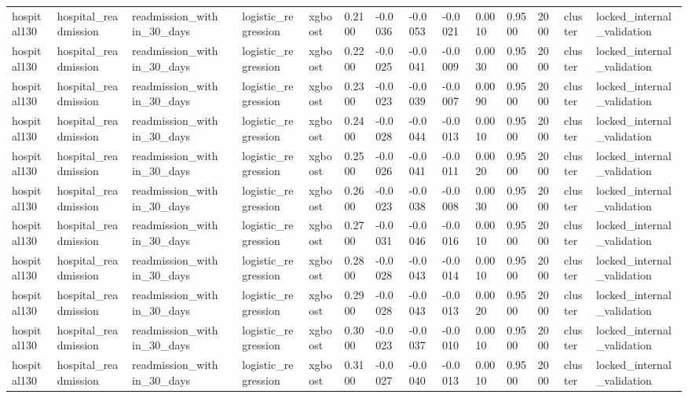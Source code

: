 \begin{tabular}{lllllllllllllll}
hospital130 & hospital\_readmission & readmission\_within\_30\_days &  & logistic\_regression & xgboost & 0.2100 & -0.0036 & -0.0053 & -0.0021 & 0.0010 & 0.9500 & 2000 & cluster & locked\_internal\_validation \\
hospital130 & hospital\_readmission & readmission\_within\_30\_days &  & logistic\_regression & xgboost & 0.2200 & -0.0025 & -0.0041 & -0.0009 & 0.0030 & 0.9500 & 2000 & cluster & locked\_internal\_validation \\
hospital130 & hospital\_readmission & readmission\_within\_30\_days &  & logistic\_regression & xgboost & 0.2300 & -0.0023 & -0.0039 & -0.0007 & 0.0090 & 0.9500 & 2000 & cluster & locked\_internal\_validation \\
hospital130 & hospital\_readmission & readmission\_within\_30\_days &  & logistic\_regression & xgboost & 0.2400 & -0.0028 & -0.0044 & -0.0013 & 0.0010 & 0.9500 & 2000 & cluster & locked\_internal\_validation \\
hospital130 & hospital\_readmission & readmission\_within\_30\_days &  & logistic\_regression & xgboost & 0.2500 & -0.0026 & -0.0041 & -0.0011 & 0.0020 & 0.9500 & 2000 & cluster & locked\_internal\_validation \\
hospital130 & hospital\_readmission & readmission\_within\_30\_days &  & logistic\_regression & xgboost & 0.2600 & -0.0023 & -0.0038 & -0.0008 & 0.0030 & 0.9500 & 2000 & cluster & locked\_internal\_validation \\
hospital130 & hospital\_readmission & readmission\_within\_30\_days &  & logistic\_regression & xgboost & 0.2700 & -0.0031 & -0.0046 & -0.0016 & 0.0010 & 0.9500 & 2000 & cluster & locked\_internal\_validation \\
hospital130 & hospital\_readmission & readmission\_within\_30\_days &  & logistic\_regression & xgboost & 0.2800 & -0.0028 & -0.0043 & -0.0014 & 0.0010 & 0.9500 & 2000 & cluster & locked\_internal\_validation \\
hospital130 & hospital\_readmission & readmission\_within\_30\_days &  & logistic\_regression & xgboost & 0.2900 & -0.0028 & -0.0043 & -0.0013 & 0.0020 & 0.9500 & 2000 & cluster & locked\_internal\_validation \\
hospital130 & hospital\_readmission & readmission\_within\_30\_days &  & logistic\_regression & xgboost & 0.3000 & -0.0023 & -0.0037 & -0.0010 & 0.0010 & 0.9500 & 2000 & cluster & locked\_internal\_validation \\
hospital130 & hospital\_readmission & readmission\_within\_30\_days &  & logistic\_regression & xgboost & 0.3100 & -0.0027 & -0.0040 & -0.0013 & 0.0010 & 0.9500 & 2000 & cluster & locked\_internal\_validation \\

\end{tabular}
